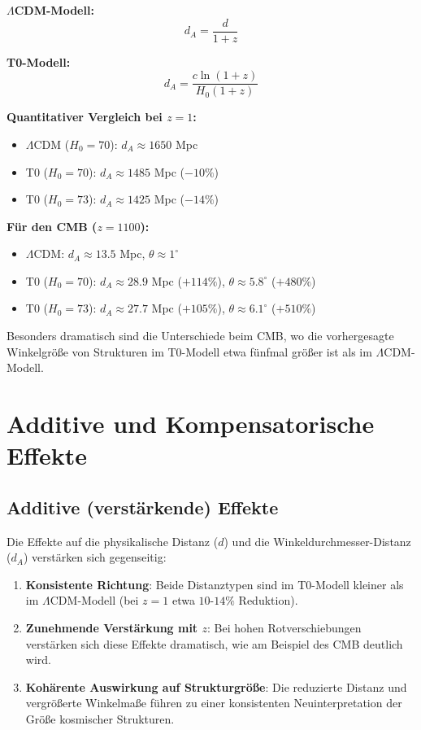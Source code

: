 \documentclass[a4paper,12pt]{article}
\theoremstyle{definition}
\theoremstyle{remark}
\begin{document}
	\textbf{$\Lambda$CDM-Modell:}
	\begin{equation}
		d_A = \frac{d}{1 + z}
	\end{equation}
	
	\textbf{T0-Modell:}
	\begin{equation}
		d_A = \frac{c \ln(1 + z)}{H_0 (1 + z)}
	\end{equation}
	
	\textbf{Quantitativer Vergleich bei $z = 1$:}
	\begin{itemize}
		\item $\Lambda$CDM ($H_0 = 70$): $d_A \approx 1650$ Mpc
		\item T0 ($H_0 = 70$): $d_A \approx 1485$ Mpc ($-10\%$)
		\item T0 ($H_0 = 73$): $d_A \approx 1425$ Mpc ($-14\%$)
	\end{itemize}
	
	\textbf{Für den CMB ($z = 1100$):}
	\begin{itemize}
		\item $\Lambda$CDM: $d_A \approx 13.5$ Mpc, $\theta \approx 1^\circ$
		\item T0 ($H_0 = 70$): $d_A \approx 28.9$ Mpc ($+114\%$), $\theta \approx 5.8^\circ$ ($+480\%$)
		\item T0 ($H_0 = 73$): $d_A \approx 27.7$ Mpc ($+105\%$), $\theta \approx 6.1^\circ$ ($+510\%$)
	\end{itemize}
	
	Besonders dramatisch sind die Unterschiede beim CMB, wo die vorhergesagte Winkelgröße von Strukturen im T0-Modell etwa fünfmal größer ist als im $\Lambda$CDM-Modell.
	
	\section{Additive und Kompensatorische Effekte}
	
	\subsection{Additive (verstärkende) Effekte}
	
	Die Effekte auf die physikalische Distanz ($d$) und die Winkeldurchmesser-Distanz ($d_A$) verstärken sich gegenseitig:
	
	\begin{enumerate}
		\item \textbf{Konsistente Richtung}: Beide Distanztypen sind im T0-Modell kleiner als im $\Lambda$CDM-Modell (bei $z = 1$ etwa $10$-$14\%$ Reduktion).
		
		\item \textbf{Zunehmende Verstärkung mit $z$}: Bei hohen Rotverschiebungen verstärken sich diese Effekte dramatisch, wie am Beispiel des CMB deutlich wird.
		
		\item \textbf{Kohärente Auswirkung auf Strukturgröße}: Die reduzierte Distanz und vergrößerte Winkelmaße führen zu einer konsistenten Neuinterpretation der Größe kosmischer Strukturen.
	\end{enumerate}
	
\end{document}
